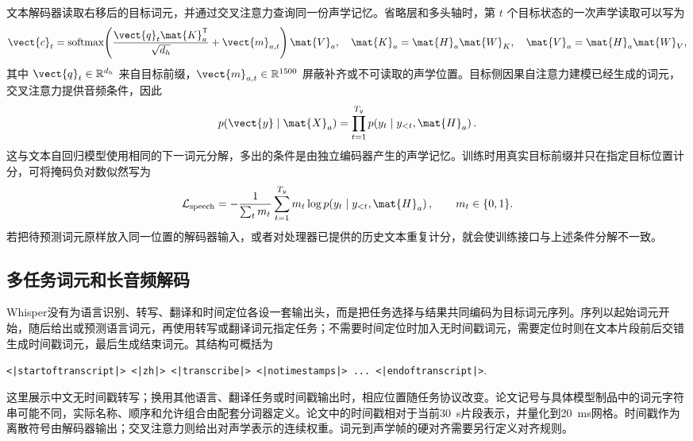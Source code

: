\documentclass[../textbook.tex]{subfiles}
\begin{document}
文本解码器读取右移后的目标词元，并通过交叉注意力查询同一份声学记忆。省略层和多头轴时，第 $t$ 个目标状态的一次声学读取可以写为
\begin{equation}
 \vect{c}_t=
 \operatorname{softmax}\!\left(
  \frac{\vect{q}_t\mat{K}_a^{\mathsf T}}{\sqrt{d_h}}+\vect{m}_{a,t}
 \right)\mat{V}_a,
 \quad
 \mat{K}_a=\mat{H}_a\mat{W}_K,
 \quad
 \mat{V}_a=\mat{H}_a\mat{W}_V,
 \label{eq:mm-whisper-cross-attention}
\end{equation}
其中 $\vect{q}_t\in\mathbb R^{d_h}$ 来自目标前缀，$\vect{m}_{a,t}\in\mathbb R^{1500}$ 屏蔽补齐或不可读取的声学位置。目标侧因果自注意力建模已经生成的词元，交叉注意力提供音频条件，因此
\begin{equation}
 p(\vect{y}\mid\mat{X}_a)
 =\prod_{t=1}^{T_y}
 p\!\left(y_t\mid y_{<t},\mat{H}_a\right).
 \label{eq:mm-whisper-factorization}
\end{equation}
这与文本自回归模型使用相同的下一词元分解，多出的条件是由独立编码器产生的声学记忆。训练时用真实目标前缀并只在指定目标位置计分，可将掩码负对数似然写为
\begin{equation}
 \mathcal L_{\mathrm{speech}}
 =-\frac{1}{\sum_t m_t}
 \sum_{t=1}^{T_y}m_t
 \log p\!\left(y_t\mid y_{<t},\mat{H}_a\right),
 \qquad m_t\in\{0,1\}.
 \label{eq:mm-whisper-loss}
\end{equation}
若把待预测词元原样放入同一位置的解码器输入，或者对处理器已提供的历史文本重复计分，就会使训练接口与上述条件分解不一致。

\subsection{多任务词元和长音频解码}
Whisper没有为语言识别、转写、翻译和时间定位各设一套输出头，而是把任务选择与结果共同编码为目标词元序列。序列以起始词元开始，随后给出或预测语言词元，再使用转写或翻译词元指定任务；不需要时间定位时加入无时间戳词元，需要定位时则在文本片段前后交错生成时间戳词元，最后生成结束词元。其结构可概括为
\begin{center}
\small
\texttt{<|startoftranscript|> <|zh|> <|transcribe|> <|notimestamps|> ... <|endoftranscript|>}.
\end{center}
这里展示中文无时间戳转写；换用其他语言、翻译任务或时间戳输出时，相应位置随任务协议改变。论文记号与具体模型制品中的词元字符串可能不同，实际名称、顺序和允许组合由配套分词器定义。论文中的时间戳相对于当前\SI{30}{\second}片段表示，并量化到\SI{20}{\milli\second}网格。时间戳作为离散符号由解码器输出；交叉注意力则给出对声学表示的连续权重。词元到声学帧的硬对齐需要另行定义对齐规则。
\end{document}
